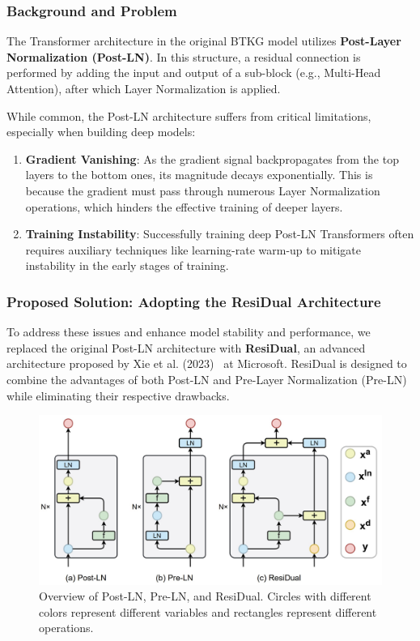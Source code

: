 \subsubsection*{Background and Problem}

The Transformer architecture in the original BTKG model utilizes \textbf{Post-Layer Normalization (Post-LN)}. In this structure, a residual connection is performed by adding the input and output of a sub-block (e.g., Multi-Head Attention), after which Layer Normalization is applied.

While common, the Post-LN architecture suffers from critical limitations, especially when building deep models:

\begin{enumerate}[nosep]
    \item \textbf{Gradient Vanishing}: As the gradient signal backpropagates from the top layers to the bottom ones, its magnitude decays exponentially. This is because the gradient must pass through numerous Layer Normalization operations, which hinders the effective training of deeper layers.
    
    \item \textbf{Training Instability}: Successfully training deep Post-LN Transformers often requires auxiliary techniques like learning-rate warm-up to mitigate instability in the early stages of training.
\end{enumerate}

\subsubsection*{Proposed Solution: Adopting the ResiDual Architecture}

To address these issues and enhance model stability and performance, we replaced the original Post-LN architecture with \textbf{ResiDual}, an advanced architecture proposed by Xie et al. (2023)~\cite{ResiDual} at Microsoft. ResiDual is designed to combine the advantages of both Post-LN and Pre-Layer Normalization (Pre-LN) while eliminating their respective drawbacks.

\begin{figure}[H]
    \centering
    \includegraphics[width=1\linewidth]{image/residual.jpg}
    \caption{Overview of Post-LN, Pre-LN, and ResiDual. Circles with different colors represent different variables and rectangles represent different operations.}
    \label{fig:residual}
\end{figure}

